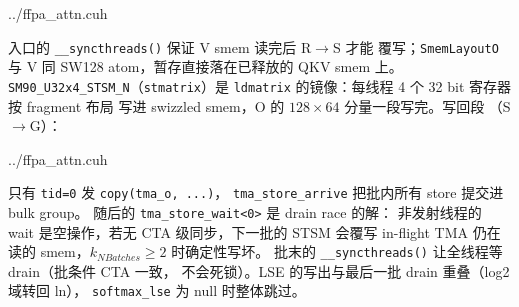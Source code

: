 \begin{lstinputlisting}[linerange={1204-1226},firstnumber=auto,
  title={ffpa\_attn.cuh L1204-1226（epilogue 批 I：$\div\ell$、f16、STSM 暂存复用 QKV smem）}]{../ffpa_attn.cuh}
\end{lstinputlisting}

入口的 \texttt{\_\_syncthreads()} 保证 V smem 读完后 R$\to$S 才能
覆写；\texttt{SmemLayoutO} 与 V 同 SW128 atom，暂存直接落在已释放的
QKV smem 上。\texttt{SM90\_U32x4\_STSM\_N}（\texttt{stmatrix}）是
\texttt{ldmatrix} 的镜像：每线程 4 个 32 bit 寄存器按 fragment 布局
写进 swizzled smem，O 的 $128\times64$ 分量一段写完。写回段
（S$\to$G）：

\begin{lstinputlisting}[linerange={1227-1246},firstnumber=auto,
  title={ffpa\_attn.cuh L1227-1246（epilogue 批 II：TMA store bulk group + drain）}]{../ffpa_attn.cuh}
\end{lstinputlisting}

只有 \texttt{tid=0} 发 \texttt{copy(tma\_o, ...)}，
\texttt{tma\_store\_arrive} 把批内所有 store 提交进 bulk group。
随后的 \texttt{tma\_store\_wait<0>} 是 drain race 的解：
非发射线程的 wait 是空操作，若无 CTA 级同步，下一批的 STSM 会覆写
in-flight TMA 仍在读的 smem，$k_{NBatches} \ge 2$ 时确定性写坏。
批末的 \texttt{\_\_syncthreads()} 让全线程等 drain（批条件 CTA 一致，
不会死锁）。LSE 的写出与最后一批 drain 重叠（log2 域转回 ln），
\texttt{softmax\_lse} 为 null 时整体跳过。

